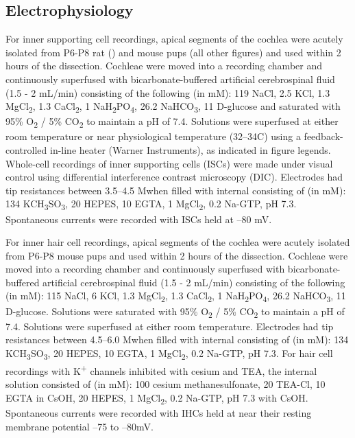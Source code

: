 \documentclass[9pt,lineno]{elife}
\begin{document}
\subsection{Electrophysiology}
For inner supporting cell recordings, apical segments of the cochlea were acutely isolated from P6-P8 rat () and mouse pups (all other figures) and used within 2 hours of the dissection. Cochleae were moved into a recording chamber and continuously superfused with bicarbonate-buffered artificial cerebrospinal fluid (1.5 - 2 mL/min) consisting of the following (in mM): 119 NaCl, 2.5 KCl, 1.3 MgCl\textsubscript{2}, 1.3 CaCl\textsubscript{2}, 1 NaH\textsubscript{2}PO\textsubscript{4}, 26.2 NaHCO\textsubscript{3}, 11 D-glucose and saturated with 95\% O\textsubscript{2} / 5\% CO\textsubscript{2} to maintain a pH of 7.4. Solutions were superfused at either room temperature or near physiological temperature (32--34\textdegree C) using a feedback-controlled in-line heater (Warner Instruments), as indicated in figure legends.  Whole-cell recordings of inner supporting cells (ISCs) were made under visual control using differential interference contrast microscopy (DIC). Electrodes had tip resistances between 3.5--4.5 M\textohm \hspace{0.5mm}when filled with internal consisting of (in mM): 134 KCH\textsubscript{3}SO\textsubscript{3}, 20 HEPES, 10 EGTA, 1 MgCl\textsubscript{2}, 0.2 Na-GTP, pH 7.3. Spontaneous currents were recorded with ISCs held at --80 mV.

For inner hair cell recordings, apical segments of the cochlea were acutely isolated from P6-P8 mouse pups and used within 2 hours of the dissection. Cochleae were moved into a recording chamber and continuously superfused with bicarbonate-buffered artificial cerebrospinal fluid (1.5 - 2 mL/min) consisting of the following (in mM): 115 NaCl, 6 KCl, 1.3 MgCl\textsubscript{2}, 1.3 CaCl\textsubscript{2}, 1 NaH\textsubscript{2}PO\textsubscript{4}, 26.2 NaHCO\textsubscript{3}, 11 D-glucose. Solutions were saturated with 95\% O\textsubscript{2} / 5\% CO\textsubscript{2} to maintain a pH of 7.4. Solutions were superfused at either room temperature.  Electrodes had tip resistances between 4.5--6.0 M\textohm \hspace{0.5mm}when filled with internal consisting of (in mM): 134 KCH\textsubscript{3}SO\textsubscript{3}, 20 HEPES, 10 EGTA, 1 MgCl\textsubscript{2}, 0.2 Na-GTP, pH 7.3. For hair cell recordings with K\textsuperscript{+} channels inhibited with cesium and TEA, the internal solution consisted of (in mM): 100 cesium methanesulfonate, 20 TEA-Cl, 10 EGTA in CsOH, 20 HEPES, 1 MgCl\textsubscript{2}, 0.2 Na-GTP, pH 7.3 with CsOH. Spontaneous currents were recorded with IHCs held at near their resting membrane potential --75 to --80mV.
\end{document}
